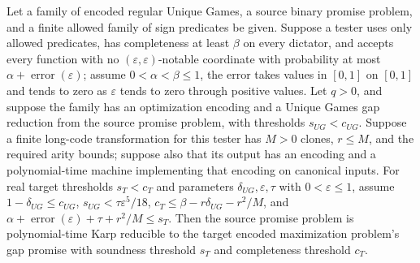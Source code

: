 \begin{theorem}
\label{FABL.EncodedRegularUniqueGamesFamily.conditional_uniqueGames_hardness}
\leanok
{}
Let a family of encoded regular Unique Games, a source binary promise problem, and a
finite allowed family of sign predicates be given. Suppose a tester uses only allowed
predicates, has completeness at least $\beta$ on every dictator, and accepts every
function with no $(\varepsilon,\varepsilon)$-notable coordinate with probability at most
$\alpha+\operatorname{error}(\varepsilon)$; assume $0<\alpha<\beta\le1$, the error takes
values in $[0,1]$ on $[0,1]$ and tends to zero as $\varepsilon$ tends to zero through
positive values. Let $q>0$, and suppose the family has an optimization encoding and a
Unique Games gap reduction from the source promise problem, with thresholds
$s_{UG}<c_{UG}$. Suppose a finite long-code transformation for this tester has $M>0$
clones, $r\le M$, and the required arity bounds; suppose also that its output has an
encoding and a polynomial-time machine implementing that encoding on canonical inputs.
For real target thresholds $s_T<c_T$ and parameters $\delta_{UG},\varepsilon,\tau$ with
$0<\varepsilon\le1$, assume $1-\delta_{UG}\le c_{UG}$, $s_{UG}<\tau\varepsilon^5/18$,
$c_T\le\beta-r\delta_{UG}-r^2/M$, and
$\alpha+\operatorname{error}(\varepsilon)+\tau+r^2/M\le s_T$. Then the source promise
problem is polynomial-time Karp reducible to the target encoded maximization problem's
gap promise with soundness threshold $s_T$ and completeness threshold $c_T$.
\end{theorem}

